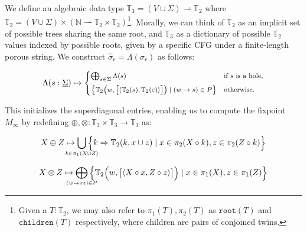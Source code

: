 \documentclass[sigplan,review,anonymous,acmsmall]{acmart}\settopmatter{printfolios=false,printccs=false,printacmref=false}
\begin{document}
  We define an algebraic data type $\mathbb{T}_3 = (V \cup \Sigma) \rightharpoonup \mathbb{T}_2$ where $\mathbb{T}_2 = (V \cup \Sigma) \times (\mathbb{N} \rightharpoonup \mathbb{T}_2\times\mathbb{T}_2)$\footnote{Given a $T:\mathbb{T}_2$, we may also refer to $\pi_1(T), \pi_2(T)$ as $\texttt{root}(T)$ and $\texttt{children}(T)$ respectively, where children are pairs of conjoined twins.}. Morally, we can think of $\mathbb{T}_2$ as an implicit set of possible trees sharing the same root, and $\mathbb{T}_3$ as a dictionary of possible $\mathbb{T}_2$ values indexed by possible roots, given by a specific CFG under a finite-length porous string. We construct $\hat\sigma_r = \Lambda(\sigma_r)$ as follows:

\vspace{-10pt}\begin{equation*}
  \begin{footnotesize}
\Lambda(s: \underline\Sigma) \mapsto \begin{cases}
\bigoplus_{s\in \Sigma} \Lambda(s) & \text{if $s$ is a hole,} \vspace{5pt}\\
\big\{\mathbb{T}_2\big(w, \big[\langle\mathbb{T}_2(s), \mathbb{T}_2(\varepsilon)\rangle\big]\big) \mid (w \rightarrow s)\in P\big\} & \text{otherwise.}
\end{cases}
  \end{footnotesize}
\end{equation*}

\noindent This initializes the superdiagonal entries, enabling us to compute the fixpoint $M_\infty$ by redefining $\oplus, \otimes: \mathbb{T}_3 \times \mathbb{T}_3 \rightarrow \mathbb{T}_3$ as:

\begin{equation*}
  \begin{footnotesize}
  X \oplus Z \mapsto \bigcup_{\mathclap{k\in \pi_1(X \cup Z)}}\Big\{k \Rightarrow \mathbb{T}_2(k, x \cup z) \mid x \in \pi_2(X\circ k), z \in \pi_2(Z\circ k)\Big\}
  \end{footnotesize}
\end{equation*}

\begin{equation*}
  \begin{footnotesize}
  X \otimes Z \mapsto \bigoplus_{\mathclap{(w\rightarrow xz) \in P}}\Big\{\mathbb{T}_2\Big(w, \big[\langle X\circ x, Z\circ z\rangle\big]\Big) \mid x \in \pi_1(X), z \in \pi_1(Z)\Big\}
\end{footnotesize}
\end{equation*}
\end{document}
